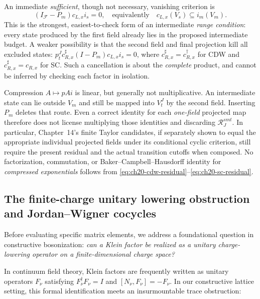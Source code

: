An immediate \emph{sufficient}, though not necessary, vanishing
criterion is
\begin{equation}
 (I_{\mathcal F}-P_m)c_{L,x}i_s=0,
 \quad\text{equivalently}\quad
 c_{L,x}(V_s)\subseteq i_m(V_m).
 \label{eq:ch20-safe-intermediate}
\end{equation}
This is the strongest, easiest-to-check form of an intermediate
\emph{range condition}: every state produced by the first field already
lies in the proposed intermediate budget.  A weaker possibility is that
the second field and final projection kill all excluded states:
\(p_t^J c_{R,x}^{\sharp}(I-P_m)c_{L,x}i_s=0\), where
\(c_{R,x}^{\sharp}=c_{R,x}^{\dagger}\) for CDW and
\(c_{R,x}^{\sharp}=c_{R,x}\) for SC.  Such a cancellation is about the
\emph{complete} product, and cannot be inferred by checking each factor
in isolation.

\begin{remark}
\label{rem:ch20-not-multiplicative}
Compression \(A\mapsto p A i\) is linear, but generally not
multiplicative.  An intermediate state can lie outside \(V_m\) and still
be mapped into \(V_t^J\) by the second field.  Inserting \(P_m\)
deletes that route.  Even a correct identity for each \emph{one-field}
projected map therefore does not license multiplying those identities
and discarding \(\mathcal R_J^{smt}\).  In particular, Chapter~14's
finite Taylor candidates, if separately shown to equal the appropriate
individual projected fields under its conditional cyclic criterion,
still require the present residual and the actual transition cutoffs when
composed.  No factorization, commutation, or Baker--Campbell--Hausdorff
identity for \emph{compressed exponentials} follows from
\eqref{eq:ch20-cdw-residual}--\eqref{eq:ch20-sc-residual}.
\end{remark}

\subsection{The finite-charge unitary lowering obstruction and Jordan--Wigner cocycles}
\label{subsec:ch20-charge-nogo-cocycles}

Before evaluating specific matrix elements, we address a foundational question in
constructive bosonization: \emph{can a Klein factor be realized as a unitary charge-lowering
operator on a finite-dimensional charge space?}

In continuum field theory, Klein factors are frequently written as unitary operators
$F_\nu$ satisfying $F_\nu^\dagger F_\nu = I$ and $[N_\nu, F_\nu] = -F_\nu$.
In our constructive lattice setting, this formal identification meets an insurmountable
trace obstruction:

